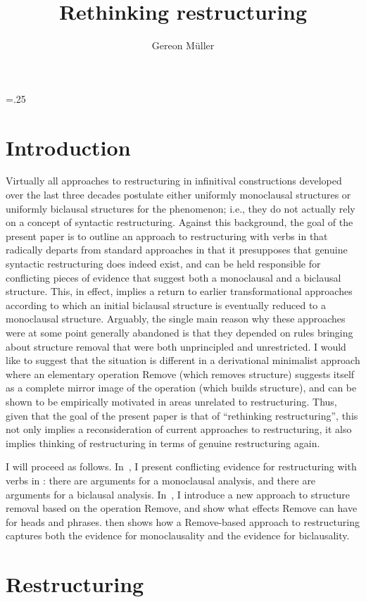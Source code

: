 \documentclass[output=paper]{langsci/langscibook}
\author{Gereon Müller\affiliation{Leipzig University}}
\title{Rethinking restructuring}
\begin{document}
\glsresetall
\multicolsep=.25\baselineskip
\section{Introduction}

Virtually all approaches to restructuring in infinitival constructions
developed over the last three decades postulate either uniformly monoclausal
structures or uniformly biclausal structures for the phenomenon; i.e., they do
not actually rely on a concept of syntactic restructuring. Against this
background, the goal of the present paper is to outline an approach to
restructuring with  verbs in  that radically departs from standard
approaches in that it presupposes that genuine syntactic restructuring does
indeed exist, and can be held responsible for conflicting pieces of evidence
that suggest both a monoclausal and a biclausal structure. This, in effect,
implies a return to earlier transformational approaches according to which an
initial biclausal structure is eventually reduced to a monoclausal structure.
Arguably, the single main reason why these approaches were at some point
generally abandoned is that they depended on  rules bringing about
structure removal that were both unprincipled and unrestricted. I would like to
suggest that the situation is different in a derivational minimalist approach
where an elementary operation Remove (which removes structure) suggests itself
as a complete mirror image of the operation  (which builds structure), and
can be shown to be empirically motivated in areas unrelated to restructuring.
Thus, given that the goal of the present paper is that of ``rethinking
restructuring'', this not only implies a reconsideration of current approaches
to restructuring, it also implies thinking of restructuring in terms of genuine
restructuring again.

I will proceed as follows. In~, I present conflicting evidence
for restructuring with  verbs in : there are arguments for a
monoclausal analysis, and there are arguments for a biclausal analysis.
In~, I introduce a new approach to structure removal based on
the operation Remove, and show what effects Remove can have for heads and
phrases.  then shows how a Remove-based approach to
restructuring captures both the evidence for monoclausality and the evidence
for biclausality.

\section{Restructuring}\label{sec:32.2}
\end{document}
